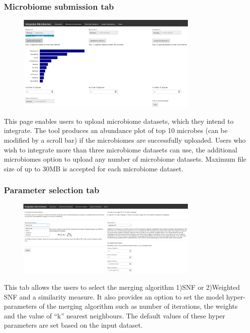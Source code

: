 \subsubsection{Microbiome submission tab}
\begin{figure}[!h]
	\centering
\includegraphics[width=0.8\textwidth]{image/microbiome_sub-tab.PNG}
\end{figure}
This page enables users to upload microbiome datasets, which they intend to integrate. The tool produces an abundance plot of top 10 microbes (can be modified by a scroll bar) if the microbiomes are successfully uploaded. Users who wish to integrate more than three microbiome datasets can use, the additional microbiomes option to upload any number of microbiome datasets. Maximum file size of up to 30MB is accepted for each microbiome dataset.
\subsubsection{Parameter selection tab}
\begin{figure}[H]
	\centering
\includegraphics[width=0.8\textwidth]{image/parameter_sel-tab.png}
\end{figure}
This tab allows the users to select the merging algorithm 1)SNF or 2)Weighted SNF and a similarity measure. It also provides an option to set the model hyper-parameters of the merging algorithm such as number of iterations, the weights and the value of “k” nearest neighbours. The default values of these hyper parameters are set based on the input dataset.
